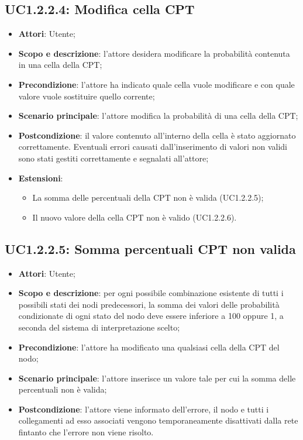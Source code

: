 \subsection{UC1.2.2.4: Modifica cella CPT} 
\hypertarget{UC1.2.2.4}{} 
\begin{itemize} 
	\item{\textbf{Attori}: Utente;} 
	\item{\textbf{Scopo e descrizione}: l'attore desidera modificare la probabilità contenuta in una cella della CPT;} 
	\item{\textbf{Precondizione}: l'attore ha indicato quale cella vuole modificare e con quale valore vuole sostituire quello corrente;}
	\item{\textbf{Scenario principale}: l'attore modifica la probabilità di una cella della CPT;} 
	\item{\textbf{Postcondizione}: il valore contenuto all'interno della cella è stato aggiornato correttamente. Eventuali errori causati dall'inserimento di valori non validi sono stati gestiti correttamente e segnalati all'attore;}
	\item{\textbf{Estensioni}:
		\begin{itemize}
			\item{La somma delle percentuali della CPT non è valida (UC1.2.2.5);}
			\item{Il nuovo valore della cella CPT non è valido (UC1.2.2.6).}
		\end{itemize}
	}
\end{itemize}
\subsection{UC1.2.2.5: Somma percentuali CPT non valida} 
\hypertarget{UC1.2.2.5}{} 
\begin{itemize} 
	\item{\textbf{Attori}: Utente;} 
	\item{\textbf{Scopo e descrizione}: per ogni possibile combinazione esistente di tutti i possibili stati dei nodi predecessori, la somma dei valori delle probabilità condizionate di ogni stato del nodo deve essere inferiore a 100 oppure 1, a seconda del sistema di interpretazione scelto;} 
	\item{\textbf{Precondizione}: l'attore ha modificato una qualsiasi cella della CPT del nodo;}
	\item{\textbf{Scenario principale}: l'attore inserisce un valore tale per cui la somma delle percentuali non è valida;}  
	\item{\textbf{Postcondizione}: l'attore viene informato dell'errore, il nodo e tutti i collegamenti ad esso associati vengono temporaneamente disattivati dalla rete fintanto che l'errore non viene risolto.}
\end{itemize} 
